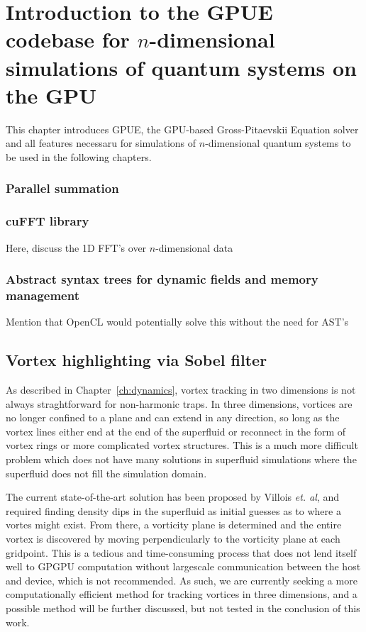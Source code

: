 \chapter{Introduction to the GPUE codebase for $n$-dimensional simulations of quantum systems on the GPU}
\label{ch:3d}

This chapter introduces GPUE, the GPU-based Gross-Pitaevskii Equation solver and all features necessaru for simulations of $n$-dimensional quantum systems to be used in the following chapters.

\subsection{Parallel summation}

\subsection{cuFFT library}

Here, discuss the 1D FFT's over $n$-dimensional data

\subsection{Abstract syntax trees for dynamic fields and memory management}

Mention that OpenCL would potentially solve this without the need for AST's


\section{Vortex highlighting via Sobel filter}

As described in Chapter~\ref{ch:dynamics}, vortex tracking in two dimensions is not always straghtforward for non-harmonic traps.
In three dimensions, vortices are no longer confined to a plane and can extend in any direction, so long as the vortex lines either end at the end of the superfluid or reconnect in the form of vortex rings or more complicated vortex structures.
This is a much more difficult problem which does not have many solutions in superfluid simulations where the superfluid does not fill the simulation domain.

The current state-of-the-art solution has been proposed by Villois \textit{et. al}, and required finding density dips in the superfluid as initial guesses as to where a vortes might exist.
From there, a vorticity plane is determined and the entire vortex is discovered by moving perpendicularly to the vorticity plane at each gridpoint.
This is a tedious and time-consuming process that does not lend itself well to GPGPU computation without largescale communication between the host and device, which is not recommended.
As such, we are currently seeking a more computationally efficient method for tracking vortices in three dimensions, and a possible method will be further discussed, but not tested in the conclusion of this work.


